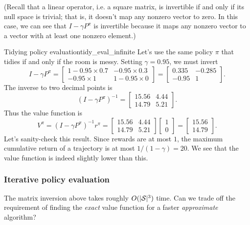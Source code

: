 \documentclass[\main/main]{subfiles}
\begin{document}
(Recall that a linear operator, i.e. a square matrix, is invertible if and only if its null space is trivial; that is, it doesn't map any nonzero vector to zero. In this case, we can see that $I - \gamma P^\pi$ is invertible because it maps any nonzero vector to a vector with at least one nonzero element.)

\begin{example}{Tidying policy evaluation}{tidy_eval_infinite}
    Let's use the same policy $\pi$ that tidies if and only if the room is messy.
    Setting $\gamma = 0.95$, we must invert
    \[
        I - \gamma P^{\pi} = \begin{bmatrix} 1 - 0.95 \times 0.7 & - 0.95 \times 0.3 \\ - 0.95 \times 1 & 1 - 0.95 \times 0 \end{bmatrix} = \begin{bmatrix} 0.335 & -0.285 \\ -0.95 & 1 \end{bmatrix}.
    \]
    The inverse to two decimal points is
    \[
        (I - \gamma P^{\pi})^{-1} = \begin{bmatrix} 15.56 & 4.44 \\ 14.79 & 5.21 \end{bmatrix}.
    \]
    Thus the value function is
    \[
        V^{\pi} = (I - \gamma P^{\pi})^{-1} r^{\pi} = \begin{bmatrix} 15.56 & 4.44 \\ 14.79 & 5.21 \end{bmatrix} \begin{bmatrix} 1 \\ 0 \end{bmatrix} = \begin{bmatrix} 15.56 \\ 14.79 \end{bmatrix}.
    \]
    Let's sanity-check this result. Since rewards are at most $1$, the maximum cumulative return of a trajectory is at most $1/(1-\gamma) = 20$. We see that the value function is indeed slightly lower than this.
\end{example}


\subsubsection{Iterative policy evaluation}
\label{sec:iterative_pe}

The matrix inversion above takes roughly $O(|\S|^3)$ time. Can we trade off the requirement of finding the \emph{exact} value function for a faster \emph{approximate} algorithm?
\end{document}
